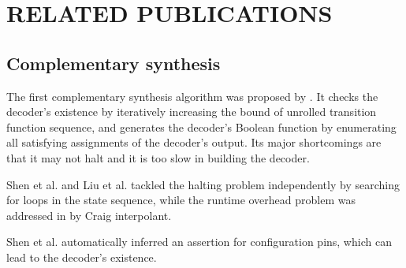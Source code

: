 \documentclass[runningheads,a4paper,orivec]{llncs}
\begin{document}
 















\section{RELATED PUBLICATIONS}\label{sec_relwork}
%
%

\subsection{Complementary synthesis}\label{subsec_compsyn_relat}
The first complementary synthesis algorithm was proposed by \cite{ShenICCAD09}.
It checks the decoder's existence by iteratively increasing the bound of unrolled transition function sequence,
and generates the decoder's Boolean function by enumerating all satisfying assignments of the decoder's output.
Its major shortcomings are that it may not halt and it is too slow
in building the decoder.

Shen et al.\cite{ShenTCAD11} and Liu et al.\cite{LiuICCAD11} tackled the halting problem independently by searching for loops in the state sequence,
while the runtime overhead problem was addressed in \cite{ShenTCAD12,LiuICCAD11} by Craig interpolant\cite{interp_McMillan}.

Shen et al.\cite{ShenTCAD12} automatically inferred an assertion for configuration pins, 
which can lead to the decoder's existence.
\end{document}
